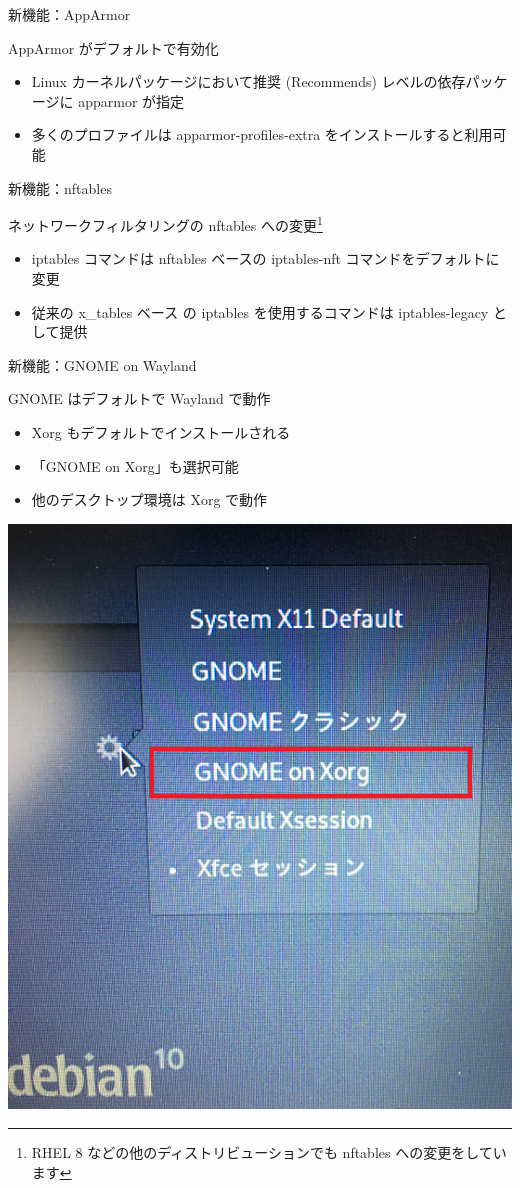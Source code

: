 \begin{frame}{新機能：AppArmor}

AppArmor がデフォルトで有効化

\begin{itemize}
\item Linux カーネルパッケージにおいて推奨 (Recommends) レベルの依存パッケージに apparmor が指定
\item 多くのプロファイルは apparmor-profiles-extra をインストールすると利用可能
\end{itemize}
    
\end{frame}


\begin{frame}{新機能：nftables}

ネットワークフィルタリングの nftables への変更\footnote{RHEL 8 などの他のディストリビューションでも nftables への変更をしています}
  
\begin{itemize}
\item iptables コマンドは nftables ベースの iptables-nft コマンドをデフォルトに変更
\item 従来の x\_tables ベース の iptables を使用するコマンドは iptables-legacy として提供
\end{itemize}
    
\end{frame}


\begin{frame}{新機能：GNOME on Wayland}

GNOME はデフォルトで Wayland で動作

\begin{itemize}
\item Xorg もデフォルトでインストールされる
\item 「GNOME on Xorg」も選択可能
\item 他のデスクトップ環境は Xorg で動作
\end{itemize}

\begin{center}
  \includegraphics[width=0.5\hsize]{image201902/GDM_GNOME_select_mark.png}
\end{center}

\end{frame}


